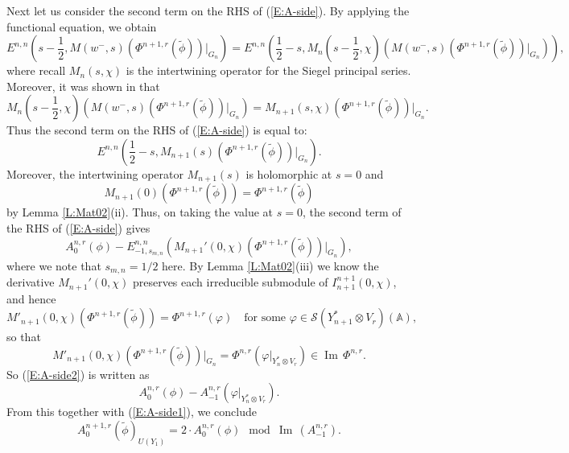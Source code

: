 \documentclass[10pt]{amsart}
\theoremstyle{plain}
\numberwithin{equation}{section}
\begin{document}
  Next let us consider the second term on the RHS of
  (\ref{E:A-side}). By applying the functional equation, we obtain
\[   E^{n,n}\left(s - \frac{1}{2}, M(w^-, s)(\Phi^{n+1,r}(\tilde{\phi}))|_{G_n}\right)
  =  E^{n,n}\left(\frac{1}{2} -s,  M_n(s - \frac{1}{2},\chi)\left(
  M(w^-, s)(\Phi^{n+1,r}(\tilde{\phi}))|_{G_n}\right)\right),\]
where recall $M_n(s,\chi)$ is the intertwining operator for the Siegel
principal series. Moreover, it was shown in \cite[Lemma 1.2.2]{KR3} that 
  \[    M_n(s - \frac{1}{2},\chi)\left( M(w^-,
  s)(\Phi^{n+1,r}(\tilde{\phi}))|_{G_{n}}\right)
= M_{n+1}(s,\chi)(\Phi^{n+1,r}(\tilde{\phi}))|_{G_{n}}. \]
  Thus the second term on the RHS of (\ref{E:A-side}) is equal to:
 \[   E^{n,n}(\frac{1}{2} -s,   M_{n+1}(s)(
 \Phi^{n+1,r}(\tilde{\phi}))|_{G_n}). \]
Moreover, the intertwining operator $M_{n+1}(s)$ is holomorphic at $s=0$ and 
   \[   M_{n+1}(0)( \Phi^{n+1,r}(\tilde{\phi}))  = \Phi^{n+1,r}(\tilde{\phi}) \]
   by Lemma \ref{L:Mat02}(ii).  Thus, on taking the value at $s= 0$,
   the second term of the RHS of (\ref{E:A-side}) gives
   \begin{equation}\label{E:A-side2}
A^{n,r}_0(\phi)  -
   E^{n,n}_{-1, s_{m,n}}(M_{n+1}'(0,\chi)(\Phi^{n+1,r}(\tilde{\phi}))|_{G_n} ),
\end{equation}
where we note that $s_{m,n}  = 1/2$ here.
  By Lemma \ref{L:Mat02}(iii) we know the derivative $M_{n+1}'(0,\chi)$
  preserves each irreducible submodule of $I_{n+1}^{n+1}(0,\chi)$, and hence
  \[  M'_{n+1}(0,\chi)(\Phi^{n+1,r}(\tilde{\phi}))  = \Phi^{n+1,r}(\varphi)
  \quad \text{for some $\varphi \in
  \mathcal{S}(Y_{n+1}^* \otimes V_r)({\mathbb{A}}) $,} \]
  so that
  \[  M'_{n+1}(0,\chi)(\Phi^{n+1,r}(\tilde{\phi}))|_{G_n} =
  \Phi^{n,r}(\varphi|_{Y_n^* \otimes V_r}) \in {\operatorname{Im\,}} \Phi^{n,r}. \]
So (\ref{E:A-side2}) is written as
\[A^{n,r}_0(\phi)  -
   A^{n,r}_{-1}(\varphi|_{Y_n^* \otimes V_r}).
\]
From this together with (\ref{E:A-side1}), we conclude
\begin{equation}\label{E:A-side-fin}
A^{n+1,r}_0(\tilde{\phi})_{U(Y_1)}  = 2 \cdot A^{n,r}_0(\phi)
 \mod{{\operatorname{Im\,}} (A^{n,r}_{-1})}.
\end{equation}
   \vskip 10pt
   
\end{document}
